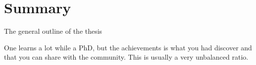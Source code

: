 \clearpage
\chapter*{Summary}
The general outline of the thesis
\label{sec:summary}

\begin{singlespace}
One learns a lot while a PhD, but the achievements is what you had
discover and that you can share with the community. This is usually a very
unbalanced ratio.
\end{singlespace}
